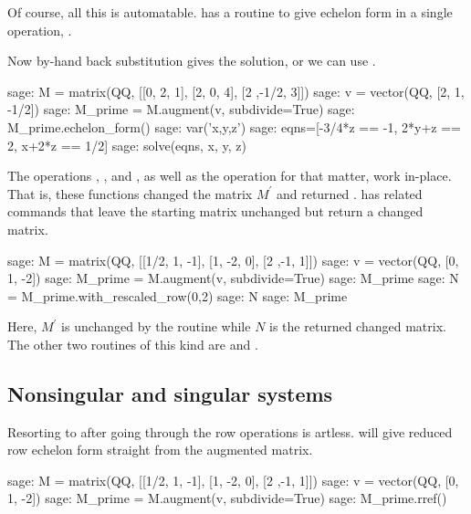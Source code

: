 Of course, all this is automatable. 
\Sage{} has a routine to give echelon form in a single operation,
.

Now by-hand back substitution gives the solution, or we can 
use .
\begin{sagecommandline}
sage: M = matrix(QQ, [[0, 2, 1], [2, 0, 4], [2 ,-1/2, 3]])
sage: v = vector(QQ, [2, 1, -1/2])                        
sage: M_prime = M.augment(v, subdivide=True)
sage: M_prime.echelon_form()              
sage: var('x,y,z')
sage: eqns=[-3/4*z == -1, 2*y+z == 2, x+2*z == 1/2]
sage: solve(eqns, x, y, z)
\end{sagecommandline}

The operations ,
, and ,
as well as the operation  for that matter,
work in-place. 
That is, these functions changed the matrix $M^\prime$
and returned .
\Sage{} has related commands that leave the starting matrix unchanged
but return a changed matrix.
\begin{sagecommandline}
sage: M = matrix(QQ, [[1/2, 1, -1], [1, -2, 0], [2 ,-1, 1]])
sage: v = vector(QQ, [0, 1, -2])
sage: M_prime = M.augment(v, subdivide=True) 
sage: M_prime
sage: N = M_prime.with_rescaled_row(0,2)
sage: N      
sage: M_prime
\end{sagecommandline}
\noindent
Here, $M^\prime$ is unchanged by the routine while $N$ is the returned 
changed matrix.
The other two routines of this kind are  
and .




\subsection{Nonsingular and singular systems}
Resorting to  after going through the row operations 
is artless.
\Sage{} will give reduced row echelon form straight from the augmented matrix.
\begin{sagecommandline}
sage: M = matrix(QQ, [[1/2, 1, -1], [1, -2, 0], [2 ,-1, 1]])
sage: v = vector(QQ, [0, 1, -2])
sage: M_prime = M.augment(v, subdivide=True) 
sage: M_prime.rref()
\end{sagecommandline}


